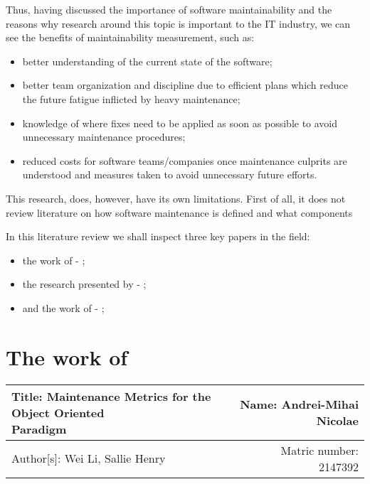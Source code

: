 \documentclass[a4paper,portrait,12pt]{article}
\begin{document}
  Thus, having discussed the importance of software maintainability and the
  reasons why research around this topic is important to the IT industry,
  we can see the benefits of maintainability measurement, such as:
    \begin{itemize}
      \item better understanding of the current state of the software;
      \item better team organization and discipline due to efficient plans 
      which reduce the future fatigue inflicted by heavy maintenance;
      \item knowledge of where fixes need to be applied as soon as possible
      to avoid unnecessary maintenance procedures;
      \item reduced costs for software teams/companies once maintenance 
      culprits are understood and measures taken to avoid unnecessary future
      efforts.
    \end{itemize}

  This research, does, however, have its own limitations. First of all, it does
  not review literature on how software maintenance is defined and what 
  components 
  
  In this literature review we shall inspect three key papers in the field:
    \begin{itemize}
      \item the work of \citet{oman1992metrics} - ;
      \item the research presented by \citet{pfleeger1990framework} - ;
      \item and the work of \citet{li1993maintenance} - ;
    \end{itemize}

\section{The work of \cite{li1993maintenance}}

 \begin{center}
   \begin{tabular}{ | l | r | }
    \hline
    \parbox[t]{5cm}{Title: Maintenance Metrics for the Object Oriented
                    \\ Paradigm} 
     & Name: Andrei-Mihai Nicolae \\ 
     \hline
     Author[s]: Wei Li, Sallie Henry & Matric number: 2147392 \\
    \hline
   \end{tabular}
 \end{center}
\end{document}

